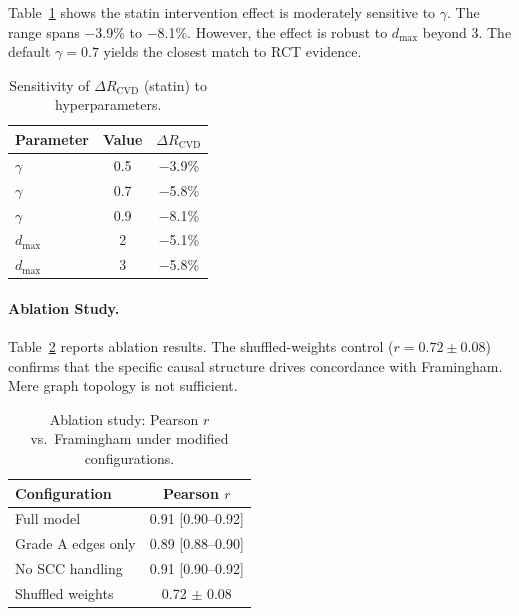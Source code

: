 \documentclass[runningheads]{llncs}
\begin{document}
Table~\ref{tab:sensitivity} shows the statin intervention effect is
moderately sensitive to $\gamma$.
The range spans $-$3.9\% to $-$8.1\%.
However, the effect is robust to $d_{\max}$ beyond 3.
The default $\gamma = 0.7$ yields the closest match to RCT evidence.

\renewcommand{\arraystretch}{1.2}
\begin{table}[t]
\centering
\caption{Sensitivity of $\Delta R_{\text{CVD}}$ (statin) to
hyperparameters.}\label{tab:sensitivity}
\small
\begin{tabular}{@{}lcc@{}}
\toprule
\textbf{Parameter} & \textbf{Value} & \textbf{$\Delta R_{\text{CVD}}$} \\
\midrule
$\gamma$ & 0.5 & $-$3.9\% \\
$\gamma$ & 0.7 & $-$5.8\% \\
$\gamma$ & 0.9 & $-$8.1\% \\
$d_{\max}$ & 2 & $-$5.1\% \\
$d_{\max}$ & 3 & $-$5.8\% \\
\bottomrule
\end{tabular}
\end{table}
\renewcommand{\arraystretch}{1.0}

\paragraph{Ablation Study.}\label{sec:ablation}
Table~\ref{tab:ablation} reports ablation results.
The shuffled-weights control ($r = 0.72 \pm 0.08$) confirms that the
specific causal structure drives concordance with Framingham.
Mere graph topology is not sufficient.

\renewcommand{\arraystretch}{1.2}
\begin{table}[t]
\centering
\caption{Ablation study: Pearson $r$ vs.\ Framingham under
modified configurations.}\label{tab:ablation}
\small
\begin{tabular}{@{}lc@{}}
\toprule
\textbf{Configuration} & \textbf{Pearson $r$} \\
\midrule
Full model           & 0.91 [0.90--0.92] \\
Grade A edges only   & 0.89 [0.88--0.90] \\
No SCC handling      & 0.91 [0.90--0.92] \\
Shuffled weights     & 0.72 $\pm$ 0.08 \\
\bottomrule
\end{tabular}
\end{table}
\renewcommand{\arraystretch}{1.0}
\end{document}
